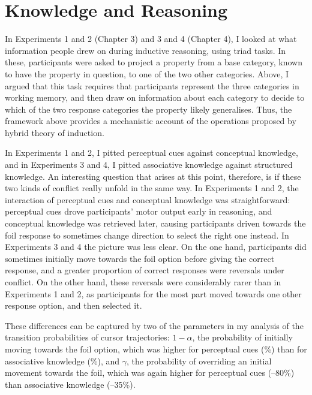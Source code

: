 
\section{Knowledge and Reasoning}\label{sec:label}

In Experiments 1 and 2 (Chapter 3) and 3 and 4 (Chapter 4),
I looked at what information people drew on during inductive reasoning,
using triad tasks.
In these, participants were asked to project a property
from a base category, known to have the property in question,
to one of the two other categories.
Above, I argued that this task requires that participants represent
the three categories in working memory,
and then draw on information about each category
to decide to which of the two response categories the property likely generalises.
Thus, the framework above provides
a mechanistic account of the operations proposed
by  hybrid theory of induction.

In Experiments 1 and 2,
I pitted perceptual cues against conceptual knowledge,
and in Experiments 3 and 4,
I pitted associative knowledge against structured knowledge.
An interesting question that arises at this point, therefore,
is if these two kinds of conflict really unfold in the same way.
In Experiments 1 and 2, the interaction of
perceptual cues and conceptual knowledge was straightforward:
perceptual cues drove participants' motor output early in reasoning,
and conceptual knowledge was retrieved later,
causing participants driven towards the foil response
to sometimes change direction to select the right one instead.
In Experiments 3 and 4 the picture was less clear.
On the one hand, participants did sometimes initially move towards the foil option
before giving the correct response,
and a greater proportion of correct responses were reversals under conflict.
On the other hand, these reversals were considerably rarer
than in Experiments 1 and 2,
as participants for the most part moved towards one other response option,
and then selected it.

These differences can be captured by two of the parameters
in my analysis of the transition probabilities of cursor trajectories:
$1 - \alpha$, the probability of initially moving towards the foil option,
which was higher for perceptual cues (\%)
than for associative knowledge (\%),
and $\gamma$, the probability of overriding an initial movement towards the foil,
which was again higher for perceptual cues (--80\%)
than associative knowledge (--35\%).

